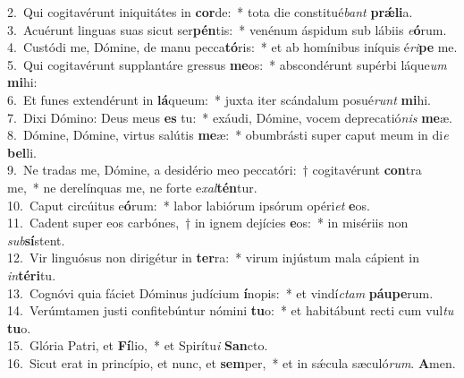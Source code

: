 {2.~}Qui cogitavérunt iniquitátes in \textbf{cor}de:~* tota die constitué\textit{bant} \textbf{prǽ}\textbf{li}a.\\
{3.~}Acuérunt linguas suas sicut ser\textbf{pén}tis:~* venénum áspidum sub lábiis \textit{e}\textbf{ó}rum.\\
{4.~}Custódi me, Dómine, de manu pecca\textbf{tó}ris:~* et ab homínibus iníquis é\textit{ri}\textbf{pe} me.\\
{5.~}Qui cogitavérunt supplantáre gressus \textbf{me}os:~* abscondérunt supérbi láque\textit{um} \textbf{mi}hi:\\
{6.~}Et funes extendérunt in \textbf{lá}queum:~* juxta iter scándalum posué\textit{runt} \textbf{mi}hi.\\
{7.~}Dixi Dómino: Deus meus \textbf{es} tu:~* exáudi, Dómine, vocem deprecatió\textit{nis} \textbf{me}æ.\\
{8.~}Dómine, Dómine, virtus salútis \textbf{me}æ:~* obumbrásti super caput meum in di\textit{e} \textbf{bel}li.\\
{9.~}Ne tradas me, Dómine, a desidério meo peccatóri:~† cogitavérunt \textbf{con}tra me,~* ne derelínquas me, ne forte e\textit{xal}\textbf{tén}tur.\\
{10.~}Caput circúitus e\textbf{ó}rum:~* labor labiórum ipsórum opéri\textit{et} \textbf{e}os.\\
{11.~}Cadent super eos carbónes,~† in ignem dejícies \textbf{e}os:~* in misériis non \textit{sub}\textbf{sí}stent.\\
{12.~}Vir linguósus non dirigétur in \textbf{ter}ra:~* virum injústum mala cápient in \textit{in}\textbf{té}\textbf{ri}tu.\\
{13.~}Cognóvi quia fáciet Dóminus judícium \textbf{í}nopis:~* et vindí\textit{ctam} \textbf{páu}\textbf{pe}rum.\\
{14.~}Verúmtamen justi confitebúntur nómini \textbf{tu}o:~* et habitábunt recti cum vul\textit{tu} \textbf{tu}o.\\
{15.~}Glória Patri, et \textbf{Fí}lio,~* et Spirítu\textit{i} \textbf{San}cto.\\
{16.~}Sicut erat in princípio, et nunc, et \textbf{sem}per,~* et in sǽcula sæculó\textit{rum}. \textbf{A}men.\\
